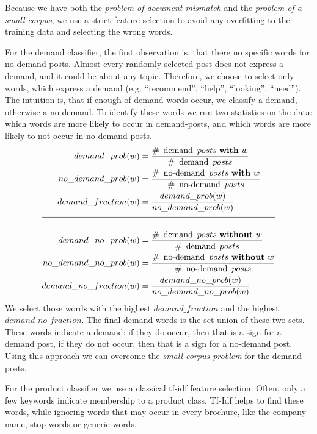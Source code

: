Because we have both the \emph{problem of document mismatch} and the \emph{problem of a small corpus}, we use a strict feature selection to avoid any overfitting to the training data and selecting the wrong words.

For the demand classifier, the first observation is, that there no specific words for no-demand posts.
Almost every randomly selected post does not express a demand, and it could be about any topic.
Therefore, we choose to select only words, which express a demand (e.g. ``recommend'', ``help'', ``looking'', ``need'').
The intuition is, that if enough of demand words occur, we classify a demand, otherwise a no-demand.
To identify these words we run two statistics on the data:
which words are more likely to occur in demand-posts, and which words are more likely to not occur in no-demand posts.
\begin{alignat*}{3}
	demand\_prob(w) &= \dfrac{
	 		\#~\operatorname{demand}~posts~\mathbf{with}~w
		}{
			 \#~\operatorname{demand}~posts
		}
		\\
	no\_demand\_prob(w) &= \dfrac{
	 		\#~\operatorname{no-demand}~posts~\mathbf{with}~w
		}{
			 \#~\operatorname{no-demand}~posts
		}
		\\
	demand\_fraction(w) &= \frac{
			demand\_prob(w)
		}{
			no\_demand\_prob(w)
		}
		\\[2mm]
		\hline
		\\[0.1mm]
	demand\_no\_prob(w) &= \dfrac{
	 		\#~\operatorname{demand}~posts~\mathbf{without}~w
		}{
			 \#~\operatorname{demand}~posts
		}
		\\
	no\_demand\_no\_prob(w) &= \dfrac{
	 		\#~\operatorname{no-demand}~posts~\mathbf{without}~w
		}{
			 \#~\operatorname{no-demand}~posts
		}
		\\
	demand\_no\_fraction(w) &= \frac{
			demand\_no\_prob(w)
		}{
			no\_demand\_no\_prob(w)
		}
\end{alignat*}
We select those words with the highest $demand\_fraction$ and the highest $demand\_no\_fraction$.
The final demand words is the set union of these two sets.
These words indicate a demand: if they do occur, then that is a sign for a demand post, if they do not occur, then that is a sign for a no-demand post.
Using this approach we can overcome the \emph{small corpus problem} for the demand posts.

For the product classifier we use a classical tf-idf\cite{sparck1972statistical} feature selection.
Often, only a few keywords indicate membership to a product class.
Tf-Idf helps to find these words, while ignoring words that may occur in every brochure, like the company name, stop words or generic words.

